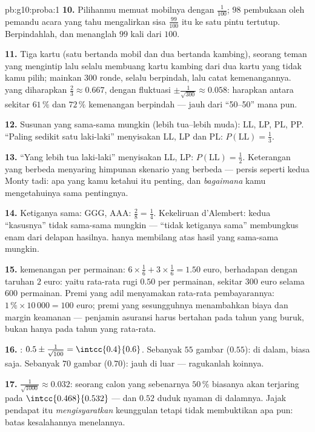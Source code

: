 \begin{solution}{pb:g10:proba:1}
\textbf{10.} Pilihanmu memuat mobilnya dengan 
$\frac{1}{100}$; $98$ pembukaan oleh pemandu acara yang tahu mengalirkan
sisa $\frac{99}{100}$ itu ke satu pintu tertutup. Berpindahlah,
dan menanglah $99$ kali dari $100$.

\textbf{11.} Tiga kartu (satu bertanda mobil dan dua bertanda
kambing), seorang teman yang mengintip lalu selalu membuang kartu
kambing dari dua kartu yang tidak kamu
pilih; mainkan $300$ ronde, selalu berpindah, lalu catat kemenangannya.
 yang diharapkan $\frac23 \approx 0.667$, dengan fluktuasi
$\pm\frac{1}{\sqrt{300}} \approx 0.058$: harapkan antara sekitar
$61\,\%$ dan $72\,\%$ kemenangan berpindah --- jauh dari
``50--50'' mana pun.

\textbf{12.} Susunan yang sama-sama mungkin (lebih tua--lebih muda):
LL, LP, PL, PP. ``Paling sedikit satu laki-laki'' menyisakan LL, LP dan PL:
$P(\text{LL}) = \frac13$.

\textbf{13.} ``Yang lebih tua laki-laki'' menyisakan LL, LP:
$P(\text{LL}) = \frac12$. Keterangan yang berbeda menyaring
himpunan skenario yang berbeda --- persis seperti kedua Monty tadi: apa
yang kamu ketahui itu penting, dan \emph{bagaimana} kamu mengetahuinya
sama pentingnya.

\textbf{14.} Ketiganya sama: GGG, AAA: $\frac28 = \frac14$.
Kekeliruan d'Alembert: kedua ``kasusnya'' tidak sama-sama mungkin
--- ``tidak ketiganya sama'' membungkus enam dari delapan hasilnya.
 hanya membilang atas hasil yang sama-sama
mungkin.

\textbf{15.}  kemenangan per permainan: $6 \times \frac16 + 3
\times \frac16 = 1.50$ euro, berhadapan dengan taruhan $2$ euro: yaitu
rata-rata rugi $0.50$ per permainan, sekitar $300$ euro selama $600$
permainan. Premi yang adil menyamakan rata-rata pembayarannya:
$1\,\% \times 10\,000 = 100$ euro; premi yang sesungguhnya menambahkan biaya
dan margin keamanan --- penjamin asuransi harus bertahan pada tahun yang
buruk, bukan hanya pada tahun yang rata-rata.

\textbf{16.} : $0.5 \pm \frac{1}{\sqrt{100}} =
\intcc{0.4}{0.6}$. Sebanyak $55$ gambar ($0.55$): di dalam, biasa saja.
Sebanyak $70$ gambar ($0.70$): jauh di luar --- ragukanlah koinnya.

\textbf{17.} $\frac{1}{\sqrt{1000}} \approx 0.032$: seorang calon
yang sebenarnya $50\,\%$ biasanya akan terjaring pada
$\intcc{0.468}{0.532}$ --- dan $0.52$ duduk nyaman di dalamnya.
Jajak pendapat itu \emph{mengisyaratkan} keunggulan tetapi tidak
membuktikan apa pun: batas kesalahannya menelannya.


\end{solution}
